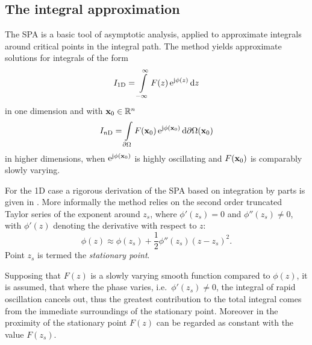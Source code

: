 \subsection{The integral approximation}
%
The SPA is a basic tool of asymptotic analysis, applied to approximate integrals around critical points in the integral path.
The method yields approximate solutions for integrals of the form
\begin{equation}
\label{Eq:SPAintegral_1d}
I_{1\mathrm{D}} = \int\limits_{-\infty}^{\infty} F(z) \, \mathrm{e}^{\mathrm{j} \phi(z)} \, \mathrm{d} z
\end{equation}
in one dimension and with $\mathbf{x}_0 \in \mathbb{R}^{n}$
\begin{equation}
\label{Eq:SPAintegral_nd}
I_{n\mathrm{D}} = \int\limits_{\partial \Omega} F(\mathbf{x}_0) \, \mathrm{e}^{\mathrm{j} \phi(\mathbf{x}_0)} \, \mathrm{d} \partial \Omega(\mathbf{x}_0)
\end{equation}
in higher dimensions, when $\mathrm{e}^{\mathrm{j} \phi(\mathbf{x}_0)}$ is highly oscillating and $F(\mathbf{x}_0)$ is comparably slowly varying.


For the 1D case a rigorous derivation of the SPA based on integration by parts is given in \cite{Bleistein1984, Blenstein1975, Williams1999}.
More informally the method relies on the second order truncated Taylor series of the exponent around $z_s$, where $\phi'(z_s) = 0$ and $\phi''(z_s) \neq 0$, with $\phi'(z)$ denoting the derivative with respect to $z$:
\begin{equation}
\phi(z) \approx \phi(z_s) + \frac{1}{2}\phi''(z_s)(z-z_s)^2.
\end{equation}
Point $z_s$ is termed the \emph{stationary point}.

Supposing that $F(z)$ is a slowly varying smooth function compared to $\phi(z)$, it is assumed, that where the phase varies, i.e.\ $\phi'(z_s) \neq 0$, the integral of rapid oscillation cancels out, thus the greatest contribution to the total integral comes from the immediate surroundings of the stationary point.
Moreover in the proximity of the stationary point $F(z)$ can be regarded as constant with the value $F(z_s)$.


